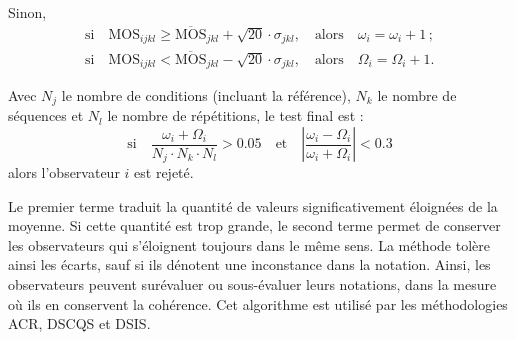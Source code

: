 Sinon,
\begin{equation*}\begin{array}{cc}
\text{si}\quad \text{MOS}_{ijkl} \geqslant \overline{\text{MOS}}_{jkl} + \sqrt{20}\cdot\sigma_{jkl},\quad \text{alors}\quad \omega_i = \omega_i + 1\, ; \\
\text{si}\quad \text{MOS}_{ijkl} < \overline{\text{MOS}}_{jkl} - \sqrt{20}\cdot\sigma_{jkl},\quad \text{alors}\quad \Omega_i = \Omega_i + 1.
\end{array}
\end{equation*}

Avec $N_j$ le nombre de conditions (incluant la référence), $N_k$ le nombre de séquences et $N_l$ le nombre de répétitions, le test final est :
\begin{equation*}
\text{si}\quad \frac{\omega_i + \Omega_i}{N_j \cdot N_k \cdot N_l} > 0.05\quad\text{et}\quad\left|\frac{\omega_i - \Omega_i}{\omega_i + \Omega_i}\right| < 0.3%
\end{equation*}
%
alors l'observateur $i$ est rejeté.

Le premier terme traduit la quantité de valeurs significativement éloignées de la moyenne. Si cette quantité est trop grande, le second terme permet de conserver les observateurs qui s'éloignent toujours dans le même sens. La méthode tolère ainsi les écarts, sauf si ils dénotent une inconstance dans la notation. Ainsi, les observateurs peuvent surévaluer ou sous-évaluer leurs notations, dans la mesure où ils en conservent la cohérence. Cet algorithme est utilisé par les méthodologies ACR, DSCQS et DSIS.


